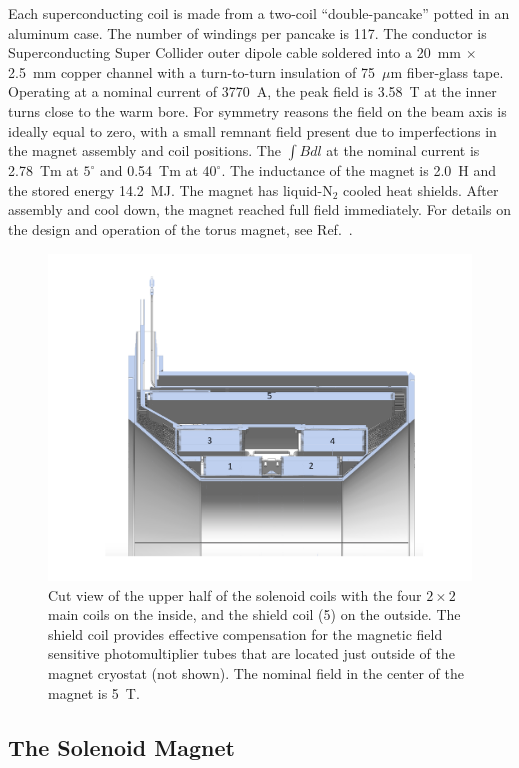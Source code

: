 \documentclass[final,3p,twocolumn]{elsarticle}
\begin{document}
Each superconducting coil is made from a two-coil ``double-pancake'' potted in an aluminum case. The number of
windings per pancake is 117. The conductor is Superconducting Super Collider outer dipole cable soldered into 
a 20~mm $\times$ 2.5~mm
copper channel with a turn-to-turn insulation of 75~$\mu$m fiber-glass tape. Operating at a nominal current of
3770~A, the peak field is 3.58~T at the inner turns close to the warm bore. For symmetry reasons the field on
the beam axis is ideally equal to zero, with a small remnant field present due to imperfections in the magnet
assembly and coil positions. The $\int {Bdl}$ at the nominal current is 2.78~Tm at $5^\circ$ and 0.54~Tm at
$40^\circ$. The inductance of the magnet is 2.0~H and the stored energy 14.2~MJ. The magnet has liquid-N$_2$
cooled heat shields. After assembly and cool down, the magnet reached full field immediately. For details on the
design and operation of the torus magnet, see Ref.~\cite{clas12-magnets}.
\begin{figure}[b!]
\centerline{\includegraphics[width=1.0\columnwidth]{Solenoid.pdf}}
\caption{Cut view of the upper half of the solenoid coils with the four $2 \times 2$ main coils on the inside, and the
  shield coil (5) on the outside. The shield coil provides effective compensation for the magnetic field sensitive
  photomultiplier tubes that are located just outside of the magnet cryostat (not shown). The nominal field in the
  center of the magnet is 5~T.}
\label{solenoid-coils}
\end{figure}


\subsection{The Solenoid Magnet}
\end{document}
